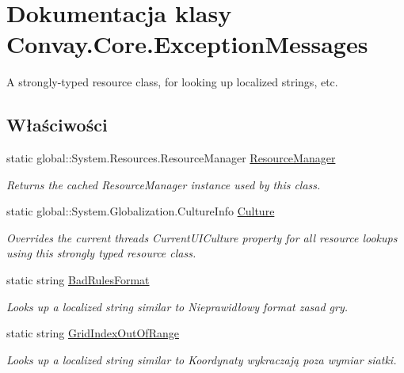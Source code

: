 \hypertarget{class_convay_1_1_core_1_1_exception_messages}{}\section{Dokumentacja klasy Convay.\+Core.\+Exception\+Messages}
\label{class_convay_1_1_core_1_1_exception_messages}


A strongly-\/typed resource class, for looking up localized strings, etc.  


\subsection*{Właściwości}
\begin{DoxyCompactItemize}
\item 
static global\+::\+System.\+Resources.\+Resource\+Manager \hyperlink{class_convay_1_1_core_1_1_exception_messages_afc60552a8b1edb41d0d4453e65d26c38}{Resource\+Manager}
\begin{DoxyCompactList}\small\item\em Returns the cached Resource\+Manager instance used by this class. \end{DoxyCompactList}\item 
static global\+::\+System.\+Globalization.\+Culture\+Info \hyperlink{class_convay_1_1_core_1_1_exception_messages_ae5e161e433a44df1737c230cdcf92ba3}{Culture}
\begin{DoxyCompactList}\small\item\em Overrides the current thread\textquotesingle{}s Current\+U\+I\+Culture property for all resource lookups using this strongly typed resource class. \end{DoxyCompactList}\item 
static string \hyperlink{class_convay_1_1_core_1_1_exception_messages_a9380387ac19ddf78f121ad20f2c52670}{Bad\+Rules\+Format}
\begin{DoxyCompactList}\small\item\em Looks up a localized string similar to Nieprawidłowy format zasad gry. \end{DoxyCompactList}\item 
static string \hyperlink{class_convay_1_1_core_1_1_exception_messages_a7976222cccaf7c82b987520268df483b}{Grid\+Index\+Out\+Of\+Range}
\begin{DoxyCompactList}\small\item\em Looks up a localized string similar to Koordynaty wykraczają poza wymiar siatki. \end{DoxyCompactList}\end{DoxyCompactItemize}


